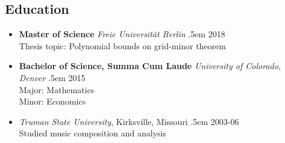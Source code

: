 \documentclass[a4paper]{article}
\makeatletter
\newcommand \brentfill {
  \tiny
  \leavevmode \cleaders 
  \hb@xt@ .5em{\hss \textperiodcentered \hss }\hfill \kern \z@
  \normalsize
}
\newcommand{\bbull}{\ding{118}}
\makeatother
\begin{document}
\subsection*{Education \hrulefill}
\begin{itemize}
  \item[\bbull] \textbf{Master of Science} \emph{Freie
    Universit\"at Berlin} \brentfill{} 2018\\
    Thesis topic:  Polynomial bounds on grid-minor theorem
  \item[\bbull] \textbf{Bachelor of Science, Summa Cum Laude} \emph{University
      of Colorado, Denver} \brentfill{} 2015\\
    Major:  Mathematics \\
    Minor: Economics
  \item[\bbull] \emph{Truman State University}, Kirksville,
    Missouri \brentfill{} 2003-06\\
    Studied music composition and analysis
\end{itemize}
\end{document}
